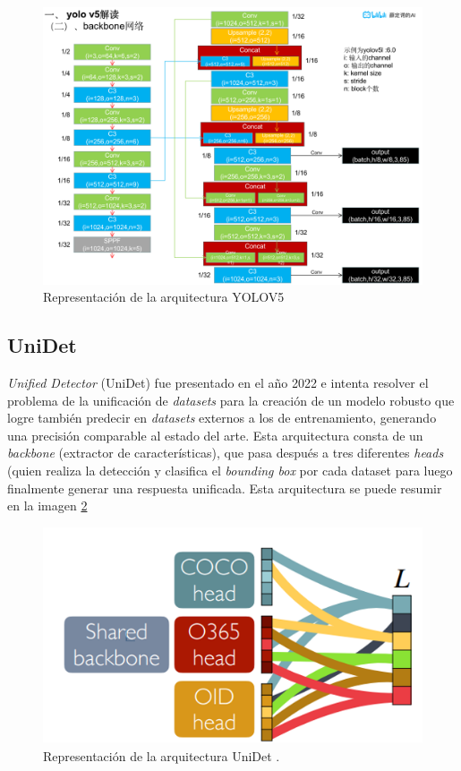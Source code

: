 \begin{figure}[h!]
\includegraphics[width=1\textwidth]{images/yolov5.png}
\centering
\caption{Representación de la arquitectura YOLOV5 \cite{yolov5}}
\label{YOLO}
\end{figure}

\subsection{UniDet}

\textit{Unified Detector} (UniDet) fue presentado en el año 2022 e intenta resolver 
el problema de la unificación de \textit{datasets} para la creación de un modelo 
robusto que logre también predecir en \textit{datasets} externos a los de entrenamiento, 
generando una precisión comparable al estado del arte. Esta arquitectura consta de un 
\textit{backbone} (extractor de características), que pasa después a tres diferentes 
\textit{heads} (quien realiza la detección y clasifica el \textit{bounding box} por cada 
dataset para luego finalmente generar una respuesta unificada. Esta arquitectura se puede 
resumir en la imagen \ref{fig:unidet}

\begin{figure}[h!]
\includegraphics[width=1\textwidth]{images/imagenUnidet.png}
\centering
\caption{Representación de la arquitectura UniDet \cite{unidet}.}
\label{fig:unidet}
\end{figure}

